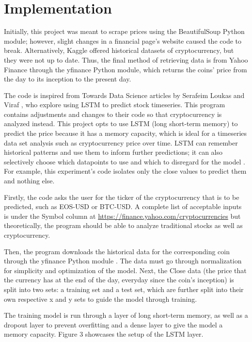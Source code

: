 \documentclass[acmtog,authorversion]{acmart}
\newcommand{\TODO}[2]{\todo[inline]{#1: #2}}
\begin{document}
\section{Implementation}

Initially, this project was meant to scrape prices using the BeautifulSoup Python module; however, slight changes in a financial page's website caused the code to break. Alternatively, Kaggle offered historical datasets of cryptocurrency, but they were not up to date. Thus, the final method of retrieving data is from Yahoo Finance through the yfinance Python module, which returns the coins' price from the day to its inception to the present day.

The code is inspired from Towards Data Science articles by Serafeim Loukas \cite{c-7} and Viraf \cite{c-11}, who explore using LSTM to predict stock timeseries. This program contains adjustments and changes to their code so that cryptocurrency is analyzed instead. This project opts to use LSTM (long short-term memory) to predict the price because it has a memory capacity, which is ideal for a timeseries data set analysis such as cryptocurrency price over time. LSTM can remember historical patterns and use them to inform further predictions; it can also selectively choose which datapoints to use and which to disregard for the model \cite{c-8}. For example, this experiment's code isolates only the close values to predict them and nothing else.

Firstly, the code asks the user for the ticker of the cryptocurrency that is to be predicted, such as EOS-USD or BTC-USD. A complete list of acceptable inputs is under the Symbol column at \url{https://finance.yahoo.com/cryptocurrencies} \TODO{JP}{needs to be bibtex} but theoretically, the program should be able to analyze traditional stocks as well as cryptocurrency.

Then, the program downloads the historical data for the corresponding coin through the yfinance Python module \cite{???}. The data must go through normalization for simplicity and optimization of the model. Next, the Close data (the price that the currency has at the end of the day, everyday since the coin's inception) is split into two sets: a training set and a test set, which are further split into their own respective x and y sets to guide the model through training. 

The training model is run through a layer of long short-term memory, as well as a dropout layer to prevent overfitting and a dense layer to give the model a memory capacity. Figure 3 showcases the setup of the LSTM layer.
\end{document}
